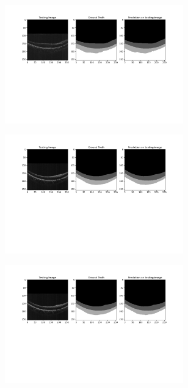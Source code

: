 \documentclass[12pt,a4paper]{scrartcl}
\begin{document}
\begin{figure} \label{fig:results_modelA}
   \centering
   \begin{subfigure}{1\textwidth}
    \centering
    \includegraphics[trim= 100 250 80 0, clip, width=0.85\textwidth]{./images/results/A_syntethic_groundtruth_predictions29052021-112413_0.png}
    \caption{}
    \label{fig:results:A:a}
   \end{subfigure}
   \begin{subfigure}{1\textwidth}
    \centering
    \includegraphics[trim= 100 250 80 0, clip, width=0.85\textwidth]{./images/results/A_syntethic_groundtruth_predictions29052021-112417_4.png}
    \caption{}
    \label{fig:results:A:b}
   \end{subfigure}
    \begin{subfigure}{1\textwidth}
    \centering
    \includegraphics[trim= 100 250 80 0, clip, width=0.85\textwidth]{./images/results/A_syntethic_groundtruth_predictions29052021-112416.png}

\end{subfigure}
\end{figure}
\end{document}
